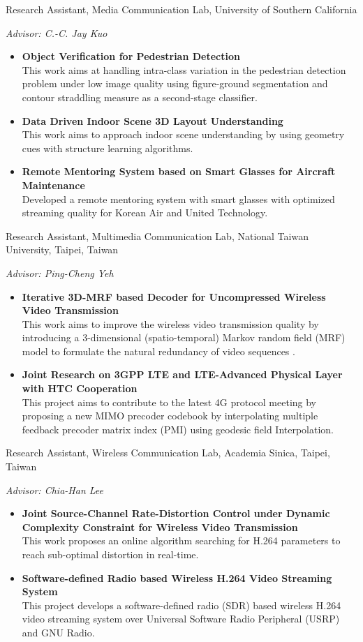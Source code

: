 \documentclass[11pt,letterpaper,sans]{moderncv} %
\begin{document}
%
{Research Assistant, Media Communication Lab, University of Southern California}
{}{}{}
{
	\textit{Advisor: C.-C. Jay Kuo}
	\begin{itemize}
		\item \textbf{Object Verification for Pedestrian Detection} \\
		This work aims at handling intra-class variation in the pedestrian detection problem under low image quality using figure-ground segmentation and contour straddling measure as a second-stage classifier.
		\item \textbf{Data Driven Indoor Scene 3D Layout Understanding} \\
		This work aims to approach indoor scene understanding by using geometry cues with structure learning algorithms.
		\item \textbf{Remote Mentoring System based on Smart Glasses for Aircraft Maintenance} \\
		Developed a remote mentoring system with smart glasses with optimized streaming quality for Korean Air and United Technology. 
	\end{itemize}
}



%
{Research Assistant, Multimedia Communication Lab, National Taiwan University, Taipei, Taiwan}
{}{}{}
{
	\textit{Advisor: Ping-Cheng Yeh}
	\begin{itemize}
		\item \textbf{Iterative 3D-MRF based Decoder for Uncompressed Wireless Video Transmission} \\
		This work aims to improve the wireless video transmission quality by introducing a 3-dimensional (spatio-temporal) Markov random field (MRF) model to formulate the natural redundancy of video sequences . 
		\item \textbf{Joint Research on 3GPP LTE and LTE-Advanced Physical Layer with HTC Cooperation} \\
		This project aims to contribute to the latest 4G protocol meeting by proposing a new MIMO precoder codebook by interpolating multiple feedback precoder matrix index (PMI) using geodesic field Interpolation.
	\end{itemize}
}


%
{Research Assistant, Wireless Communication Lab, Academia Sinica, Taipei, Taiwan}
{}{}{}
{
	\textit{Advisor: Chia-Han Lee}
	\begin{itemize}
		\item \textbf{Joint Source-Channel Rate-Distortion Control under Dynamic Complexity Constraint for Wireless Video Transmission} \\
		This work proposes an online algorithm searching for H.264 parameters to reach sub-optimal distortion in real-time.
		\item \textbf{Software-defined Radio based Wireless H.264 Video Streaming System} \\
		This project develops a software-defined radio (SDR) based wireless H.264 video streaming system over Universal Software Radio Peripheral (USRP) and GNU Radio.
	\end{itemize}
}
\end{document}

